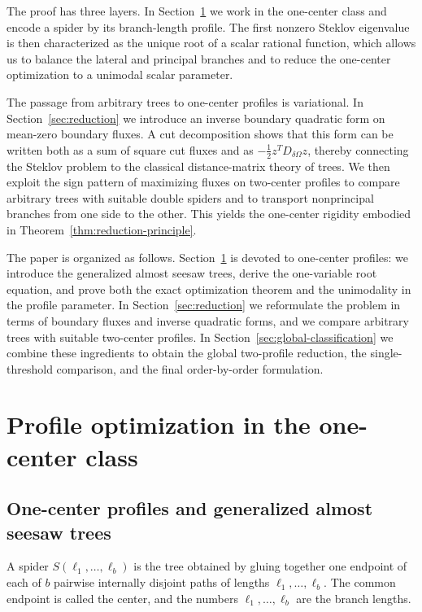 \documentclass[11pt]{article}
\theoremstyle{remark}
\begin{document}
The proof has three layers. In Section~\ref{sec:spider-family} we work in the one-center class and
encode a spider by its branch-length profile. The first nonzero Steklov eigenvalue is then
characterized as the unique root of a scalar rational function, which allows us to balance the lateral and principal branches and to reduce the one-center optimization to a unimodal scalar parameter.

The passage from arbitrary trees to one-center profiles is variational. In Section~\ref{sec:reduction} we introduce an inverse boundary quadratic form on mean-zero
boundary fluxes. A cut decomposition shows that this form can be written both as a sum of square cut fluxes and as $-\frac12 z^T D_{\delta\Omega} z$, thereby connecting the Steklov problem to the classical distance-matrix theory of trees. We then exploit the sign pattern of maximizing fluxes on two-center profiles to compare arbitrary trees with suitable double spiders and to transport nonprincipal branches from one side to the other. This yields the one-center rigidity embodied in Theorem~\ref{thm:reduction-principle}.

The paper is organized as follows. Section~\ref{sec:spider-family} is devoted to one-center profiles:
we introduce the generalized almost seesaw trees, derive the one-variable root equation, and prove
both the exact optimization theorem and the unimodality in the profile parameter. In
Section~\ref{sec:reduction} we reformulate the problem in terms of boundary fluxes and inverse quadratic
forms, and we compare arbitrary trees with suitable two-center profiles. In Section~\ref{sec:global-classification}
we combine these ingredients to obtain the global two-profile reduction, the single-threshold
comparison, and the final order-by-order formulation.

\section{Profile optimization in the one-center class}\label{sec:spider-family}


\subsection{One-center profiles and generalized almost seesaw trees}
A spider $S(\ell_1,\dots,\ell_b)$ is the tree obtained by gluing together one endpoint of each of $b$
pairwise internally disjoint paths of lengths $\ell_1,\dots,\ell_b$. The common endpoint is called
the center, and the numbers $\ell_1,\dots,\ell_b$ are the branch lengths.
\end{document}
